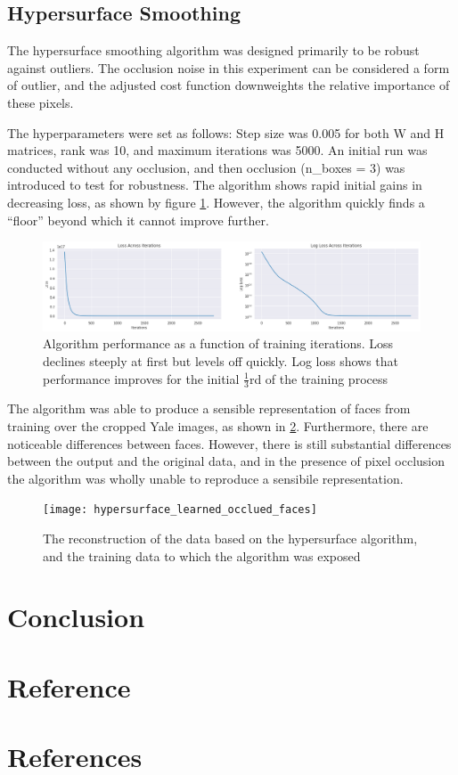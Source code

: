 \documentclass{article} %
\begin{document}
\subsection{Hypersurface Smoothing}

The hypersurface smoothing algorithm was designed primarily to be robust against outliers. The occlusion noise in this experiment can be considered a form of outlier, and the adjusted cost function downweights the relative importance of these pixels.

The hyperparameters were set as follows: Step size was 0.005 for both W and H matrices, rank was 10, and maximum iterations was 5000. An initial run was conducted without any occlusion, and then occlusion (n\_boxes = 3) was introduced to test for robustness. The algorithm shows rapid initial gains in decreasing loss, as shown by figure \ref{figure:hypersurface_logloss}. However, the algorithm quickly finds a ``floor'' beyond which it cannot improve further. 

\begin{figure}[h]
  \includegraphics[width=\textwidth]{hypersurface_logloss}
  \caption{Algorithm performance as a function of training iterations. Loss declines steeply at first but levels off quickly. Log loss shows that performance improves for the initial $\frac{1}{3}$rd of the training process}
  \label{figure:hypersurface_logloss}
\end{figure}

The algorithm was able to produce a sensible representation of faces from training over the cropped Yale images, as shown in \ref{figure:hypersurface_learned_faces}. Furthermore, there are noticeable differences between faces. However, there is still substantial differences between the output and the original data, and in the presence of pixel occlusion the algorithm was wholly unable to reproduce a sensibile representation.

\begin{figure}[h]
  \texttt{[image: hypersurface\_learned\_occlued\_faces]}
  \caption{The reconstruction of the data based on the hypersurface algorithm, and the training data to which the algorithm was exposed}
  \label{figure:hypersurface_learned_faces}
\end{figure}

\section{Conclusion}

\section{Reference}

\section{References}


\end{document}
